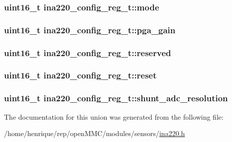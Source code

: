 \hypertarget{unionina220__config__reg__t_a0680ce2aeac1e0a6067ad2927e3161ce}{
\subsubsection[{mode}]{\setlength{\rightskip}{0pt plus 5cm}uint16\-\_\-t ina220\-\_\-config\-\_\-reg\-\_\-t\-::mode}}\label{unionina220__config__reg__t_a0680ce2aeac1e0a6067ad2927e3161ce}
\hypertarget{unionina220__config__reg__t_a84e00dbce45740223ede3a35928a75e4}{
\subsubsection[{pga\-\_\-gain}]{\setlength{\rightskip}{0pt plus 5cm}uint16\-\_\-t ina220\-\_\-config\-\_\-reg\-\_\-t\-::pga\-\_\-gain}}\label{unionina220__config__reg__t_a84e00dbce45740223ede3a35928a75e4}
\hypertarget{unionina220__config__reg__t_aef59be74854fd52f940ba84cbe5e3698}{
\subsubsection[{reserved}]{\setlength{\rightskip}{0pt plus 5cm}uint16\-\_\-t ina220\-\_\-config\-\_\-reg\-\_\-t\-::reserved}}\label{unionina220__config__reg__t_aef59be74854fd52f940ba84cbe5e3698}
\hypertarget{unionina220__config__reg__t_ad6b429e9680e9d32115b2abcc94d480d}{
\subsubsection[{reset}]{\setlength{\rightskip}{0pt plus 5cm}uint16\-\_\-t ina220\-\_\-config\-\_\-reg\-\_\-t\-::reset}}\label{unionina220__config__reg__t_ad6b429e9680e9d32115b2abcc94d480d}
\hypertarget{unionina220__config__reg__t_a0bf0abdeb0eb4b5f0897ad8c0cf99897}{
\subsubsection[{shunt\-\_\-adc\-\_\-resolution}]{\setlength{\rightskip}{0pt plus 5cm}uint16\-\_\-t ina220\-\_\-config\-\_\-reg\-\_\-t\-::shunt\-\_\-adc\-\_\-resolution}}\label{unionina220__config__reg__t_a0bf0abdeb0eb4b5f0897ad8c0cf99897}


The documentation for this union was generated from the following file\-:\begin{DoxyCompactItemize}
\item 
/home/henrique/rep/open\-M\-M\-C/modules/sensors/\hyperlink{ina220_8h}{ina220.\-h}\end{DoxyCompactItemize}
